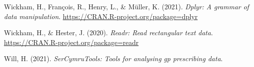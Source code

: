 \documentclass[
  english,
  man,floatsintext]{apa7}
\begin{document}
\leavevmode\hypertarget{ref-R-dplyr}{}%
Wickham, H., François, R., Henry, L., \& Müller, K. (2021). \emph{Dplyr: A grammar of data manipulation}. \url{https://CRAN.R-project.org/package=dplyr}

\leavevmode\hypertarget{ref-R-readr}{}%
Wickham, H., \& Hester, J. (2020). \emph{Readr: Read rectangular text data}. \url{https://CRAN.R-project.org/package=readr}

\leavevmode\hypertarget{ref-R-serCymruTools}{}%
Will, H. (2021). \emph{SerCymruTools: Tools for analysing gp prescribing data}.

\endgroup
\end{document}
